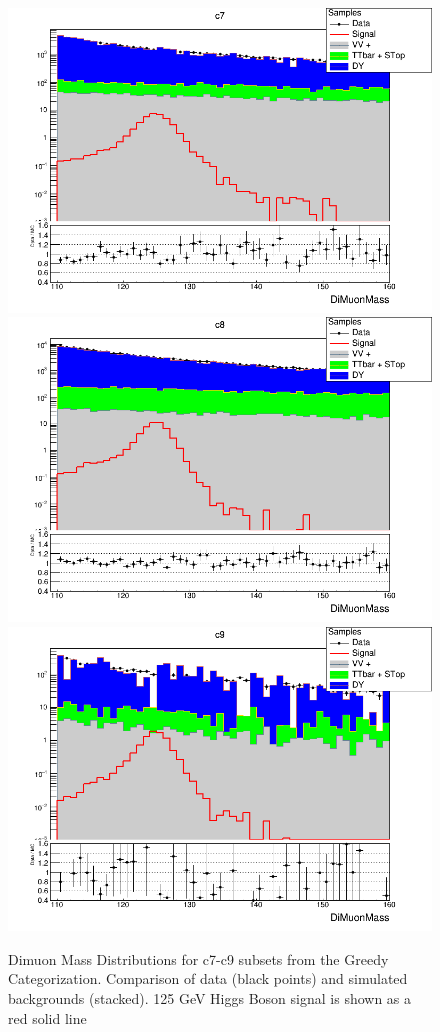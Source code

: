 \begin{figure}[htbp]
  \centering
  \includegraphics[width=0.65\linewidth]{figures/ch_higgs/distributions/bdt_uf/distribution__c7__DiMuonMass__logY.png}\\
  \includegraphics[width=0.65\linewidth]{figures/ch_higgs/distributions/bdt_uf/distribution__c8__DiMuonMass__logY.png}\\
  \includegraphics[width=0.65\linewidth]{figures/ch_higgs/distributions/bdt_uf/distribution__c9__DiMuonMass__logY.png}
  \caption{Dimuon Mass Distributions for c7-c9 subsets from the Greedy Categorization. Comparison of data (black points) and simulated backgrounds (stacked). 125 GeV Higgs Boson signal is shown as a red solid line}
  \label{fig:higgs_categorization_greedyc7c9}
\end{figure}
